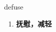 
\begin{frame}
{\huge defuse}
\begin{center}
\begin{enumerate}\Large
  \item \textbf{抚慰，减轻}
\end{enumerate}
\end{center}
\end{frame}
